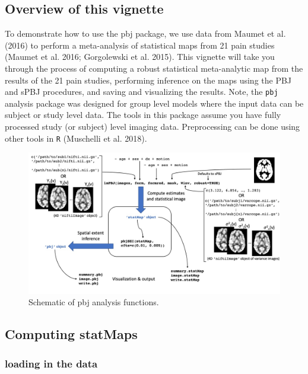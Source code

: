 \documentclass[]{article}
\begin{document}
\hypertarget{overview-of-this-vignette}{%
\subsection{Overview of this vignette}\label{overview-of-this-vignette}}

To demonstrate how to use the pbj package, we use data from Maumet et
al. (2016) to perform a meta-analysis of statistical maps from 21 pain
studies (Maumet et al. 2016; Gorgolewski et al. 2015). This vignette
will take you through the process of computing a robust statistical
meta-analytic map from the results of the 21 pain studies, performing
inference on the maps using the PBJ and sPBJ procedures, and saving and
visualizing the results. Note, the \texttt{pbj} analysis package was
designed for group level models where the input data can be subject or
study level data. The tools in this package assume you have fully
processed study (or subject) level imaging data. Preprocessing can be
done using other tools in \texttt{R} (Muschelli et al. 2018).

\begin{figure}
\centering
\includegraphics{pbj_schematic.jpg}
\caption{Schematic of pbj analysis functions.}
\end{figure}

\hypertarget{computing-statmaps}{%
\subsection{Computing statMaps}\label{computing-statmaps}}

\hypertarget{loading-in-the-data}{%
\subsubsection{loading in the data}\label{loading-in-the-data}}
\end{document}

